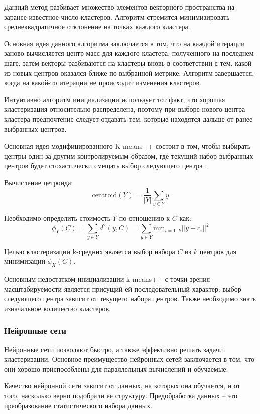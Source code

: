 Данный метод разбивает множество элементов векторного пространства на заранее известное число кластеров. Алгоритм стремится минимизировать среднеквадратичное отклонение на точках каждого кластера. 

Основная идея данного алгоритма заключается в том, что на каждой итерации заново вычисляется центр масс для каждого кластера, полученного на последнем шаге, затем векторы разбиваются на кластеры вновь в соответствии с тем, какой из новых центров оказался ближе по выбранной метрике. Алгоритм завершается, когда на какой-то итерации не происходит изменения кластеров.

Интуитивно алгоритм инициализации использует тот факт, что хорошая кластеризация относительно распределена, поэтому при выборе нового центра кластера предпочтение следует отдавать тем, которые находятся дальше от ранее выбранных центров.

Основная идея модифицированного K-means++ состоит в том, чтобы выбирать центры один за другим контролируемым образом, где текущий набор выбранных центров будет стохастически смещать выбор следующего центра \cite{bahmani2012scalable}.

Вычисление цетроида:
\begin{equation}
	\text{centroid}(Y) = \frac{1}{|Y|} \sum_{y \in Y} y
\end{equation}

Необходимо определить стоимость $Y$ по отношению к $C$ как:
\begin{equation}
	\phi_Y(C) = \sum_{y \in Y} d^2 (y, C) = \sum_{y \in Y} \text{min}_{i=1..k} ||y-c_i||^2
\end{equation}

Целью кластеризации k-средних является выбор набора $C$ из $k$ центров для минимизации $\phi_X(C)$.

Основным недостатком инициализации k-means++ с точки зрения масштабируемости является присущий ей последовательный характер: выбор следующего центра зависит от текущего набора центров. Также необходимо знать изначальное количество кластеров.

\subsubsection{Нейронные сети}
Нейронные сети позволяют быстро, а также эффективно решать задачи кластеризации. Основное преимущество нейронных сетей заключается в том, что они хорошо приспособлены для параллельных вычислений и обучаемые.

Качество нейронной сети зависит от данных, на которых она обучается, и от того, насколько верно подобрали ее структуру. Предобработка данных \cite{claster_neural} -- это преобразование статистического набора данных.

